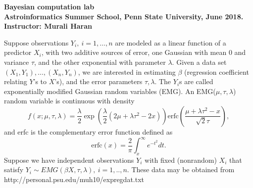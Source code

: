 \documentclass[12pt]{article}
\theoremstyle{example}
\theoremstyle{remark}
\theoremstyle{lemma}
\theoremstyle{definition}
\theoremstyle{corol}
\theoremstyle{proposition}
\theoremstyle{condition}
\begin{document}
\begin{center}
{\bf \large \noindent Bayesian computation lab\\ Astroinformatics Summer School, Penn State
  University, June 2018.  \\
Instructor: Murali Haran
}
\end{center}

\noindent \hrulefill
Suppose observations $Y_i,\:i=1,\dots,n$ are modeled as a linear
  function of a predictor $X_i$, with two additive sources of error,
  one Gaussian with mean 0 and variance $\tau$, and the other
  exponential with parameter $\lambda$. Given a data set
  $(X_1,Y_1), \dots, (X_n,Y_n)$, we are interested in estimating
  $\beta$ (regression coefficient relating $Y$'s to $X$'s), and the
  error parameters $\tau, \lambda$. The $Y_i$s are called
  exponentially modified Gaussian random variables (EMG). An
  EMG($\mu, \tau, \lambda$) random variable is continuous with density
$$f(x;\mu, \tau, \lambda) = \frac{\lambda}{2} \exp\left(\frac{\lambda}{2} (2\mu + \lambda\tau^2 - 2x)\right) \mbox{erfc}\left(\frac{\mu + \lambda\tau^2 - x}{\sqrt{2} \tau} \right), $$
and erfc is the complementary error function defined as
$$\mbox{erfc}(x) = \frac{2}{\pi} \int_x^{\infty} e^{-t^2} dt.$$
 Suppose we have independent observations $Y_i$ with fixed (nonrandom)
$X_i$ that satisfy %
$Y_i \sim EMG(\beta X, \tau, \lambda),\: i=1,..,n.$ 
These data may be obtained from\\ http://personal.psu.edu/muh10/expregdat.txt
\end{document}
